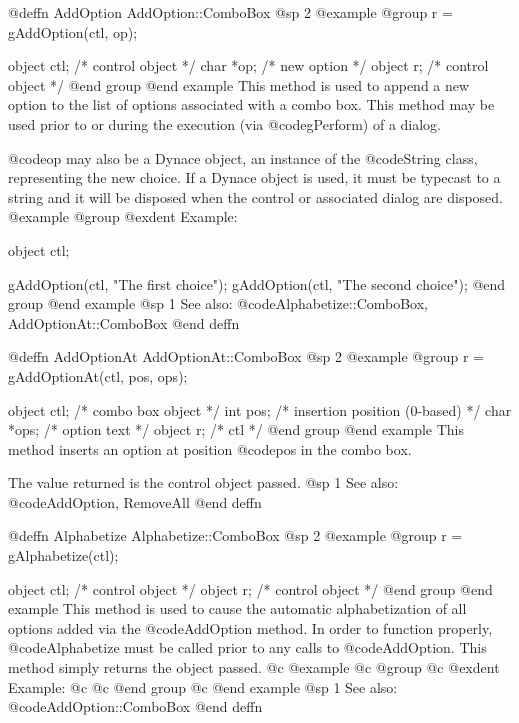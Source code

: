 {@deffn {AddOption} AddOption::ComboBox
@sp 2
@example
@group
r = gAddOption(ctl, op);

object  ctl;    /*  control object  */
char    *op;    /*  new option      */
object  r;      /*  control object  */
@end group
@end example
This method is used to append a new option to the list of options associated
with a combo box.  This method may be used prior to or during the execution
(via @code{gPerform}) of a dialog.

@code{op} may also be a Dynace object, an instance of the @code{String}
class, representing the new choice.  If a Dynace object is used, it must
be typecast to a string and it will be disposed when the control or
associated dialog are disposed.
@example
@group
@exdent Example:

object  ctl;

gAddOption(ctl, "The first choice");
gAddOption(ctl, "The second choice");
@end group
@end example
@sp 1
See also:  @code{Alphabetize::ComboBox, AddOptionAt::ComboBox}
@end deffn



@deffn {AddOptionAt} AddOptionAt::ComboBox
@sp 2
@example
@group
r = gAddOptionAt(ctl, pos, ops);

object  ctl;    /*  combo box object  */
int     pos;    /*  insertion position (0-based)  */
char    *ops;   /*  option text       */
object  r;      /*  ctl               */
@end group
@end example
This method inserts an option at position @code{pos} in the combo box.

The value returned is the control object passed.
@sp 1
See also:  @code{AddOption, RemoveAll}
@end deffn












@deffn {Alphabetize} Alphabetize::ComboBox
@sp 2
@example
@group
r = gAlphabetize(ctl);

object  ctl;    /*  control object  */
object  r;      /*  control object  */
@end group
@end example
This method is used to cause the automatic alphabetization of all
options added via the @code{AddOption} method.  In order to function
properly, @code{Alphabetize} must be called prior to any calls to
@code{AddOption}.  This method simply returns the object passed.
@c @example
@c @group
@c @exdent Example:
@c 
@c @end group
@c @end example
@sp 1
See also:  @code{AddOption::ComboBox}
@end deffn












}
